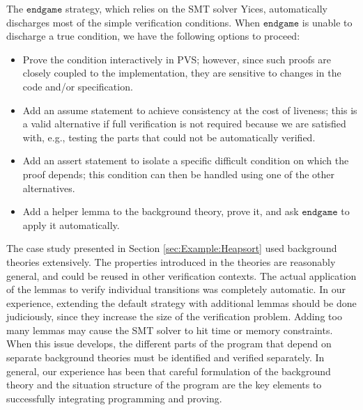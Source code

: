 \documentclass[english,submission]{eptcs}
\begin{document}
The $\texttt{endgame}$ strategy, which relies on the SMT solver Yices,
automatically discharges most of the simple verification conditions.
When $\texttt{endgame}$ is unable to discharge a true condition,
we have the following options to proceed: 
\begin{itemize}
\item Prove the condition interactively in PVS; however, since such
  proofs are closely coupled to the implementation, they are sensitive
  to changes in the code and/or specification.
\item Add an assume statement to achieve consistency at the cost of
  liveness;  this is a valid alternative if full verification is not
  required because we are satisfied with, e.g., testing the parts that
  could not be automatically verified.
\item Add an assert statement to isolate a specific difficult
  condition on which the proof depends; this condition can then be
  handled using one of the other alternatives.
\item Add a helper lemma to the background theory, prove it, and ask
  $\texttt{endgame}$ to apply it automatically.
\end{itemize}
The case study presented in Section \ref{sec:Example:Heapsort} used
background theories extensively. The properties introduced in the
theories are reasonably general, and could be reused in other
verification contexts. The actual application of the lemmas to verify
individual transitions was completely automatic. In our experience,
extending the default strategy with additional lemmas should be done
judiciously, since they increase the size of the verification problem.
Adding too many lemmas may cause the SMT solver to hit time or memory
constraints. When this issue develops, the different parts of the
program that depend on separate background theories must be identified
and verified separately.  In general, our experience has been that
careful formulation of the background theory and the situation
structure of the program are the key elements to successfully
integrating programming and proving.

\begin{small}
 

\end{small}
\end{document}
